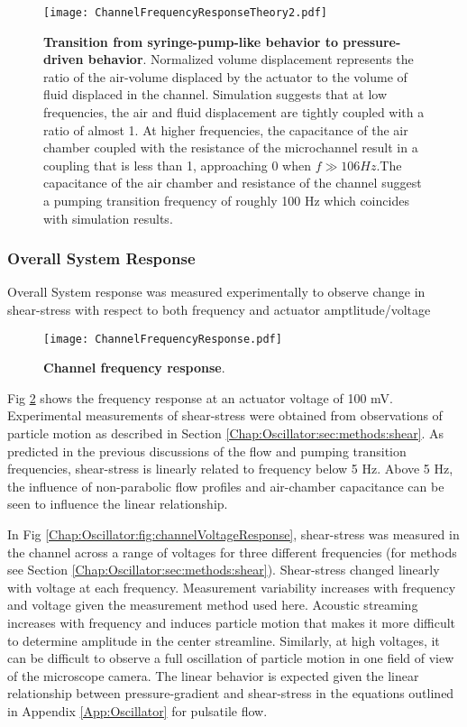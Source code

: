 \begin{figure}[!ht]
\centering
\texttt{[image: ChannelFrequencyResponseTheory2.pdf]}
\caption{\textbf{Transition from syringe-pump-like behavior to pressure-driven behavior}. Normalized volume displacement represents the ratio of the air-volume displaced by the actuator to the volume of fluid displaced in the channel. Simulation suggests that at low frequencies, the air and fluid displacement are tightly coupled with a ratio of almost 1. At higher frequencies, the capacitance of the air chamber coupled with the resistance of the microchannel result in a coupling that is less than 1, approaching 0 when $f \gg 106 Hz$.The capacitance of the air chamber and resistance of the channel suggest a pumping transition frequency of roughly 100 Hz which coincides with simulation results.}
\label{Chap:Oscillator:fig:pumpingTransition}
\end{figure}


\subsubsection{Overall System Response}
Overall System response was measured experimentally to observe change in shear-stress with respect to both frequency and actuator amptlitude\slash voltage

\begin{figure}[!ht]
\centering
\texttt{[image: ChannelFrequencyResponse.pdf]}
\caption{\textbf{Channel frequency response}. }
\label{Chap:Oscillator:fig:channelFrequencyResponse}
\end{figure}

Fig \ref{Chap:Oscillator:fig:channelFrequencyResponse} shows the frequency response at an actuator voltage of 100 mV. Experimental measurements of shear-stress were obtained from observations of particle motion as described in Section \ref{Chap:Oscillator:sec:methods:shear}. As predicted in the previous discussions of the flow and pumping transition frequencies, shear-stress is linearly related to frequency below 5 Hz. Above 5 Hz, the influence of non-parabolic flow profiles and air-chamber capacitance can be seen to influence the linear relationship.

In Fig \ref{Chap:Oscillator:fig:channelVoltageResponse}, shear-stress was measured in the channel across a range of voltages for three different frequencies (for methods see Section \ref{Chap:Oscillator:sec:methods:shear}). Shear-stress changed linearly with voltage at each frequency. Measurement variability increases with frequency and voltage given the measurement method used here. Acoustic streaming increases with frequency and induces particle motion that makes it more difficult to determine amplitude in the center streamline. Similarly, at high voltages, it can be difficult to observe a full oscillation of particle motion in one field of view of the microscope camera. The linear behavior is expected given the linear relationship between pressure-gradient and shear-stress in the equations outlined in Appendix \ref{App:Oscillator} for pulsatile flow.

